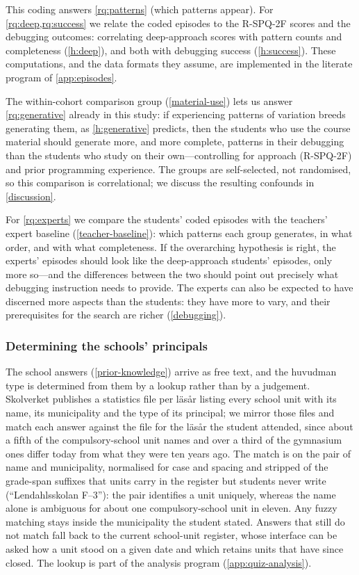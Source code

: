 This coding answers \cref{rq:patterns} (which patterns appear).
For \cref{rq:deep,rq:success} we relate the coded episodes to the R-SPQ-2F
scores and the debugging outcomes: correlating deep-approach scores with
pattern counts and completeness (\cref{h:deep}), and both with debugging
success (\cref{h:success}).
These computations, and the data formats they assume, are implemented in
the literate program of \cref{app:episodes}.

The within-cohort comparison group (\cref{material-use}) lets us answer
\cref{rq:generative} already in this study: if experiencing patterns of
variation breeds generating them, as \cref{h:generative} predicts, then the
students who use the course material should generate more, and more complete,
patterns in their debugging than the students who study on their
own---controlling for approach (R-SPQ-2F) and prior programming experience.
The groups are self-selected, not randomised, so this comparison is
correlational; we discuss the resulting confounds in \cref{discussion}.

For \cref{rq:experts} we compare the students' coded episodes with the
teachers' expert baseline (\cref{teacher-baseline}): which patterns each group generates, in
what order, and with what completeness.
If the overarching hypothesis is right, the experts' episodes should look
like the deep-approach students' episodes, only more so---and the
differences between the two should point out precisely what debugging
instruction needs to provide.
The experts can also be expected to have discerned more aspects than the
students: they have more to vary, and their prerequisites for the search
are richer (\cref{debugging}).

\subsubsection{Determining the schools' principals}
\label{school-lookup}

The school answers (\cref{prior-knowledge}) arrive as free text, and the
huvudman type is determined from them by a lookup rather than by a
judgement.
Skolverket publishes a statistics file per läsår listing every school unit
with its name, its municipality and the type of its principal; we mirror
those files and match each answer against the file for the läsår the
student attended, since about a fifth of the compulsory-school unit names
and over a third of the gymnasium ones differ today from what they were
ten years ago.
The match is on the pair of name and municipality, normalised for case and
spacing and stripped of the grade-span suffixes that units carry in the
register but students never write (\enquote{Lendahlsskolan F--3}): the
pair identifies a unit uniquely, whereas the name alone is ambiguous for
about one compulsory-school unit in eleven.
Any fuzzy matching stays inside the municipality the student stated.
Answers that still do not match fall back to the current school-unit
register, whose interface can be asked how a unit stood on a given date
and which retains units that have since closed.
The lookup is part of the analysis program (\cref{app:quiz-analysis}).

